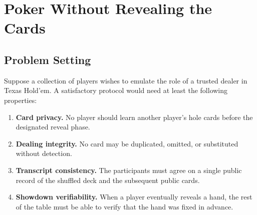 \chapter{Poker Without Revealing the Cards}

\label{chap:poker-without-revealing-the-cards}


\begin{abstract}
This chapter studies a candidate decomposition of the dealing phase of
dealer-free Texas Hold'em.  The objective is not yet to implement the full
game, but to expose four questions that a complete construction would have to
answer: how the deck is randomized, how several parties influence its order,
how cards are delivered, and how a later opening can be checked against an
earlier digest.  The accompanying program is an instructional, single-process
demonstrator.  It makes the stages inspectable; it does not prove that the
resulting procedure has the confidentiality, integrity, or fairness properties
required of a deployed protocol.
\end{abstract}

\section{Problem Setting}
Suppose a collection of players wishes to emulate the role of a trusted dealer
in Texas Hold'em. A satisfactory protocol would need at least the following
properties:
\begin{enumerate}
    \item \textbf{Card privacy.} No player should learn another player's hole
    cards before the designated reveal phase.
    \item \textbf{Dealing integrity.} No card may be duplicated, omitted, or
    substituted without detection.
    \item \textbf{Transcript consistency.} The participants must agree on a
    single public record of the shuffled deck and the subsequent public cards.
    \item \textbf{Showdown verifiability.} When a player eventually reveals a
    hand, the rest of the table must be able to verify that the hand was fixed
    in advance.
\end{enumerate}

